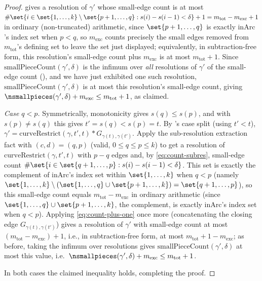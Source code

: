 \begin{proof}
  gives a resolution of $\gamma'$ whose small-edge count is at most
  $\#\set{i \in \set{1,\dots,k}\setminus\set{p+1,\dots,q} : s(i)-s(i-1)<\delta} + 1 = m_{\mathrm{tot}}
  - m_{\mathrm{exc}} + 1$ in ordinary (non-truncated) arithmetic, since $\set{p+1,\dots,q}$ is
  exactly $\mathrm{inArc}$'s index set when $p<q$, so $m_{\mathrm{exc}}$ counts precisely the small
  edges removed from $m_{\mathrm{tot}}$'s defining set to leave the set just displayed; equivalently,
  in subtraction-free form, this resolution's small-edge count plus $m_{\mathrm{exc}}$ is at most
  $m_{\mathrm{tot}}+1$. Since $\mathrm{smallPieceCount}(\gamma',\delta)$ is the infimum over
  \emph{all} resolutions of $\gamma'$ of the small-edge count (), and we
  have just exhibited one such resolution, $\mathrm{smallPieceCount}(\gamma',\delta)$ is at most
  this resolution's small-edge count, giving $\nsmallpieces(\gamma',\delta) + m_{\mathrm{exc}} \le
  m_{\mathrm{tot}}+1$, as claimed.

  \emph{Case $q<p$.} Symmetrically, monotonicity gives $s(q)\le s(p)$, and with $s(p)\ne s(q)$ this
  gives $t'=s(q)<s(p)=t$. By 's case split (using $t'<t$),
  $\gamma' = \mathrm{curveRestrict}(\gamma,t',t) * G_{\gamma(t),\gamma(t')}$. Apply the
  sub-resolution extraction fact with $(c,d)=(q,p)$ (valid, $0\le q\le p\le k$) to get a resolution
  of $\mathrm{curveRestrict}(\gamma,t',t)$ with $p-q$ edges and, by \eqref{eq:count-subres},
  small-edge count $\#\set{i\in\set{q+1,\dots,p} : s(i)-s(i-1)<\delta}$. This set is exactly the
  complement of $\mathrm{inArc}$'s index set within $\set{1,\dots,k}$ when $q<p$ (namely
  $\set{1,\dots,k}\setminus(\set{1,\dots,q}\cup\set{p+1,\dots,k}) = \set{q+1,\dots,p}$), so this
  small-edge count equals $m_{\mathrm{tot}}-m_{\mathrm{exc}}$ in ordinary arithmetic (since
  $\set{1,\dots,q}\cup\set{p+1,\dots,k}$, the complement, is exactly $\mathrm{inArc}$'s index set
  when $q<p$). Applying \eqref{eq:count-plus-one} once more (concatenating the closing edge
  $G_{\gamma(t),\gamma(t')}$) gives a resolution of $\gamma'$ with small-edge count at most
  $(m_{\mathrm{tot}}-m_{\mathrm{exc}})+1$, i.e., in subtraction-free form, at most $m_{\mathrm{tot}}
  +1-m_{\mathrm{exc}}$; as before, taking the infimum over resolutions gives
  $\mathrm{smallPieceCount}(\gamma',\delta)$ at most this value, i.e.\
  $\nsmallpieces(\gamma',\delta) + m_{\mathrm{exc}} \le m_{\mathrm{tot}}+1$.

  In both cases the claimed inequality holds, completing the proof.
\end{proof}
